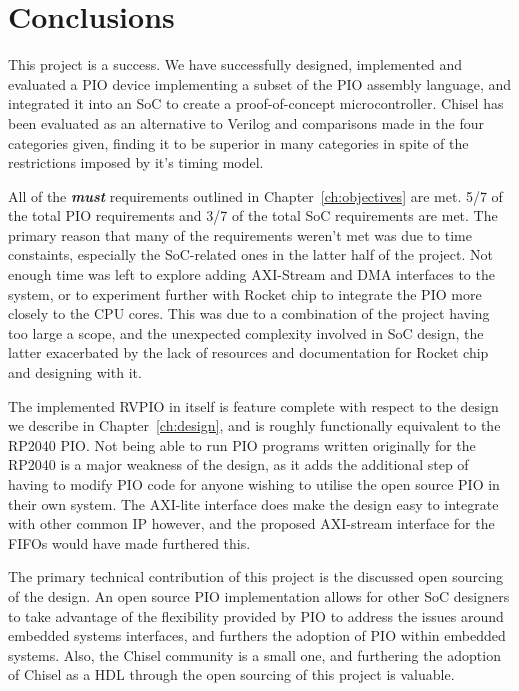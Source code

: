 \chapter{Conclusions}
\label{ch:conclusions}

This project is a success. We have successfully designed, implemented and evaluated a PIO device implementing a subset of the PIO assembly language, and integrated it into an SoC to create a proof-of-concept microcontroller. Chisel has been evaluated as an alternative to Verilog and comparisons made in the four categories given, finding it to be superior in many categories in spite of the restrictions imposed by it's timing model.

All of the \textit{\textbf{must}} requirements outlined in Chapter~\ref{ch:objectives} are met. 5/7 of the total PIO requirements and 3/7 of the total SoC requirements are met. The primary reason that many of the requirements weren't met was due to time constaints, especially the SoC-related ones in the latter half of the project. Not enough time was left to explore adding AXI-Stream and DMA interfaces to the system, or to experiment further with Rocket chip to integrate the PIO more closely to the CPU cores. This was due to a combination of the project having too large a scope, and the unexpected complexity involved in SoC design, the latter exacerbated by the lack of resources and documentation for Rocket chip and designing with it.

The implemented RVPIO in itself is feature complete with respect to the design we describe in Chapter~\ref{ch:design}, and is roughly functionally equivalent to the RP2040 PIO. Not being able to run PIO programs written originally for the RP2040 is a major weakness of the design, as it adds the additional step of having to modify PIO code for anyone wishing to utilise the open source PIO in their own system. The AXI-lite interface does make the design easy to integrate with other common IP however, and the proposed AXI-stream interface for the FIFOs would have made furthered this.

The primary technical contribution of this project is the discussed open sourcing of the design. An open source PIO implementation allows for other SoC designers to take advantage of the flexibility provided by PIO to address the issues around embedded systems interfaces, and furthers the adoption of PIO within embedded systems. Also, the Chisel community is a small one, and furthering the adoption of Chisel as a HDL through the open sourcing of this project is valuable.

